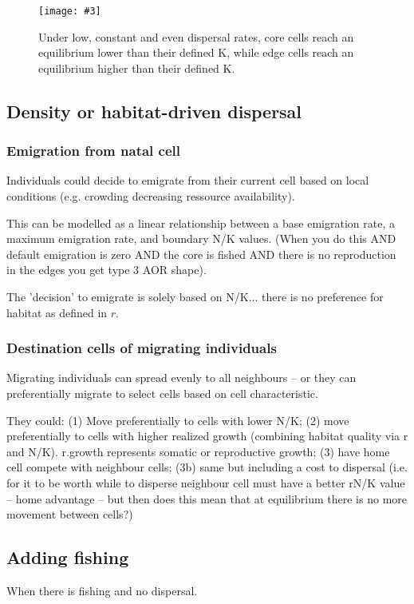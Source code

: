 \documentclass{article}
\newcommand{\capnow}{}
\newcommand{\addcenterfig}[3][Caption to be completed]{
  \begin{figure}[!h]
    \begin{center}
      \texttt{[image: \#3]}
     \caption{#1 \label{#2}}
    \end{center}
  \end{figure}
}
\begin{document}
\renewcommand{\capnow}{Under low, constant and even dispersal rates,
  core cells reach an equilibrium lower than their defined
  K, while edge cells reach an equilibrium higher than their defined K.}
\addcenterfig[\capnow]{even-low-disp}{Theo-mod_range-contrxn_emigbase-01_emigmax-01_habtype-core}

\subsection{Density or habitat-driven dispersal}

\subsubsection{Emigration from natal cell}
Individuals could decide to emigrate from their current cell based on local
conditions (e.g. crowding decreasing ressource availability).

This can be modelled as a linear relationship between a base
emigration rate, a maximum emigration rate, and boundary N/K
values. (When you do this AND default emigration is zero AND the core
is fished AND there is no reproduction in the edges you get type 3 AOR
shape).

The 'decision' to emigrate is solely based on N/K... there is no
preference for habitat as defined in $r$.

\subsubsection{Destination cells of migrating individuals}
Migrating individuals can spread evenly to all neighbours -- or they
can preferentially migrate to select cells based on cell
characteristic.

They could: (1) Move preferentially to cells with lower N/K; (2) move
preferentially to cells with higher realized growth (combining habitat
quality via r and N/K). r.growth represents somatic or reproductive
growth; (3) have home cell compete with neighbour cells; (3b) same but
including a cost to dispersal (i.e. for it to be worth while to disperse neighbour
cell must have a better rN/K value -- home advantage -- but then does
this mean that at equilibrium there is no more movement between cells?)





\subsection{Adding fishing}
When there is fishing and no dispersal.
\end{document}

